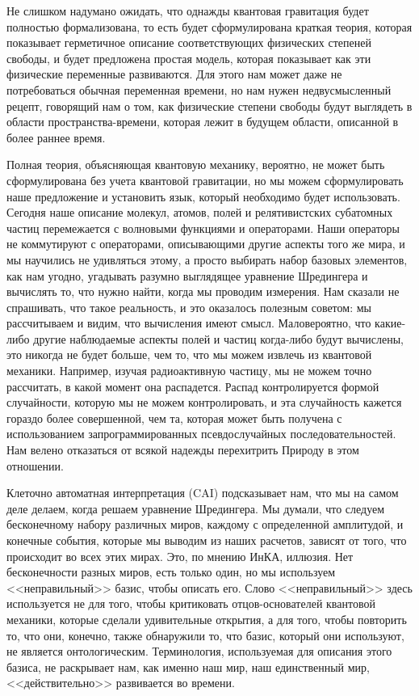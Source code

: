 \documentclass[main.tex]{subfiles}
\begin{document}
Не слишком надумано ожидать, что однажды квантовая гравитация будет полностью формализована, то есть будет сформулирована краткая теория, которая показывает герметичное описание соответствующих физических степеней свободы, и будет предложена простая модель, которая показывает как эти физические переменные развиваются. Для этого нам может даже не потребоваться обычная переменная времени, но нам нужен недвусмысленный рецепт, говорящий нам о том, как физические степени свободы будут выглядеть в области пространства-времени, которая лежит в будущем области, описанной в более раннее время.

Полная теория, объясняющая квантовую механику, вероятно, не может быть сформулирована без учета квантовой гравитации, но мы можем сформулировать наше предложение и установить язык, который необходимо будет использовать. Сегодня наше описание молекул, атомов, полей и релятивистских субатомных частиц перемежается с волновыми функциями и операторами. Наши операторы не коммутируют с операторами, описывающими другие аспекты того же мира, и мы научились не удивляться этому, а просто выбирать набор базовых элементов, как нам угодно, угадывать разумно выглядящее уравнение Шредингера и вычислять то, что нужно найти, когда мы проводим измерения. Нам сказали не спрашивать, что такое реальность, и это оказалось полезным советом: мы рассчитываем и видим, что вычисления имеют смысл. Маловероятно, что какие-либо другие наблюдаемые аспекты полей и частиц когда-либо будут вычислены, это никогда не будет больше, чем то, что мы можем извлечь из квантовой механики. Например, изучая радиоактивную частицу, мы не можем точно рассчитать, в какой момент она распадется. Распад контролируется формой случайности, которую мы не можем контролировать, и эта случайность кажется гораздо более совершенной, чем та, которая может быть получена с использованием запрограммированных псевдослучайных последовательностей. Нам велено отказаться от всякой надежды перехитрить Природу в этом отношении.

Клеточно автоматная интерпретация (CAI) подсказывает нам, что мы на самом деле делаем, когда решаем уравнение Шредингера. Мы думали, что следуем бесконечному набору различных миров, каждому с определенной амплитудой, и конечные события, которые мы выводим из наших расчетов, зависят от того, что происходит во всех этих мирах. Это, по мнению ИнКА, иллюзия. Нет бесконечности разных миров, есть только один, но мы используем <<неправильный>>  базис, чтобы описать его. Слово <<неправильный>>  здесь используется не для того, чтобы критиковать отцов-основателей квантовой механики, которые сделали удивительные открытия, а для того, чтобы повторить то, что они, конечно, также обнаружили то, что базис, который они используют, не является онтологическим. Терминология, используемая для описания этого базиса, не раскрывает нам, как именно наш мир, наш единственный мир, <<действительно>> развивается во времени.
\end{document}
